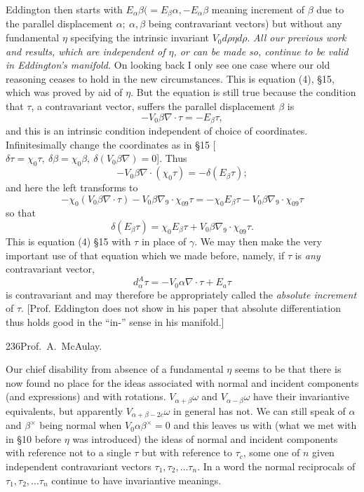 \documentclass[11pt]{article}
\begin{document}
\indent Eddington then starts with $E_\alpha\beta(=E_\beta\alpha,-E_\alpha\beta$ meaning increment of $\beta$ due to the parallel displacement $\alpha;\ \alpha,\beta$ being contravariant vectors) but without any fundamental $\eta$ specifying the intrinsic invariant $V_0d\rho\eta d\rho$. \emph{All our previous work and results, which are independent of $\eta$, or can be made so, continue to be valid in Eddington's manifold.} On looking back I only see one case where our old reasoning ceases to hold in the new circumstances. This is equation (4), \S15, which was proved by aid of $\eta$. But the equation is still true because the condition that $\tau$, a contravariant vector, suffers the parallel displacement $\beta$ is
\[
-V_0\beta\nabla\mathbin{\cdot}\tau=-E_\beta\tau,
\]
and this is an intrinsic condition independent of choice of coordinates. Infinitesimally change the coordinates as in \S15 [$\delta\tau=\chi_0\tau,\ \delta\beta=\chi_0\beta,\ \delta(V_0\beta\nabla)=0$]. Thus
\[
-V_0\beta\nabla\mathbin{\cdot}(\chi_0\tau)=-\delta(E_\beta\tau);
\]
and here the left transforms to
\[
-\chi_0(V_0\beta\nabla\mathbin{\cdot}\tau)-V_0\beta\nabla_9\mathbin{\cdot}\chi_{09}\tau=-\chi_0E_\beta\tau-V_0\beta\nabla_9\mathbin{\cdot}\chi_{09}\tau
\]
so that
\[
\delta(E_\beta\tau)=\chi_0E_\beta\tau+V_0\beta\nabla_9\mathbin{\cdot}\chi_{09}\tau.
\]
This is equation (4) \S15 with $\tau$ in place of $\gamma$. We may then make the very important use of that equation which we made before, namely, if $\tau$ is \emph{any} contravariant vector,
\[
d_\alpha^A\tau=-V_0\alpha\nabla\mathbin{\cdot}\tau+E_a\tau
\]
is contravariant and may therefore be appropriately called the \emph{absolute increment} of $\tau$. [Prof. Eddington does not show in his paper that absolute differentiation thus holds good in the ``in-'' sense in his manifold.]
\newpage\thispagestyle{empty}\begin{center}236\hfill Prof.\ A.\ McAulay.\end{center}
\indent Our chief disability from absence of a fundamental $\eta$ seems to be that there is now found no place for the ideas associated with normal and incident components (and expressions) and with rotations. $V_{\alpha+\beta}\omega$ and $V_{\alpha-\beta}\omega$ have their invariantive equivalents, but apparently $V_{\alpha+\beta-2c}\omega$ in general has not. We can still speak of $\alpha$ and $\beta^\times$ being normal when $V_0\alpha\beta^\times=0$ and this leaves us with (what we met with in \S10 before $\eta$ was introduced) the ideas of normal and incident components with reference not to a single $\tau$ but with reference to $\tau_c$, some one of $n$ given independent contravariant vectors $\tau_1,\tau_2,\ldots\tau_n$. In a word the normal reciprocals of $\tau_1,\tau_2,\ldots\tau_n$ continue to have invariantive meanings.
\end{document}

